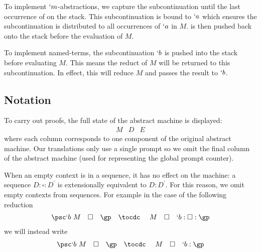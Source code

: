 To implement $`m$-abstractions, we capture the subcontinuation until the last occurrence of \gp on the stack.
This subcontinuation is bound to $`a$ which ensures the subcontinuation is distributed to all occurrences of $`a$ in $M$.
\gp is then pushed back onto the stack before the evaluation of $M$.

To implement named-terms, the subcontinuation $`b$ is pushed into the stack before evaluating $M$.
This means the reduct of $M$ will be returned to this subcontinuation.
In effect, this will reduce $M$ and passes the result to $`b$.

\subsection{Notation}
To carry out proofs, the full state of the abstract machine is displayed:
\[
\begin{array}{lll}
  M & D & E
\end{array}
\]
where each column corresponds to one component of the original abstract machine.
Our translations only use a single prompt so we omit the final column of the abstract machine 
(used for representing the global prompt counter).

When an empty context is in a sequence, it has no effect on the machine:
a sequence $D:\square:D^\prime$ is extensionally equivalent to $D:D^\prime$.
For this reason, we omit empty contexts from sequences.
For example in the case of the following reduction
\[
\begin{array}{lllclll}
  \psc `b\ M & \square & \gp & \tocdc\ & M & \square & `b:\square:\gp
\end{array}
\]
we will instead write
\[
\begin{array}{lllclll}
  \psc `b\ M & \square & \gp & \tocdc\ & M & \square & `b:\gp
\end{array}
\]


